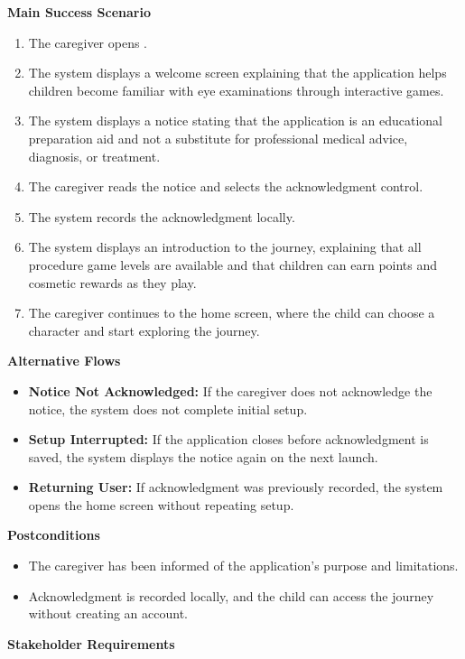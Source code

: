 \documentclass[10pt]{article}
\makeatletter
\newcommand{\termsecnum}{\ifnum\value{subsection}=0 \thesection\else\thesubsection\fi}
\newcommand{\termmark}[1]{%
  \hypertarget{term:#1}{}%
  \protected@write\@auxout{}{\string\newlabel{termsec:#1}{{\termsecnum}{\thepage}{}{}{}}}%
}
\makeatother
\begin{document}
\textbf{Main Success Scenario}
\begin{enumerate}
    \item The caregiver opens \progname{}.
    \item The system displays a welcome screen explaining that the
    application helps children become familiar with eye examinations
    through interactive games.
    \item The system displays a notice stating that the application is
    an educational preparation aid and not a substitute for professional
    medical advice, diagnosis, or treatment.
    \item The caregiver reads the notice and selects the acknowledgment
    control.
    \item The system records the acknowledgment locally.
    \item The system displays an introduction to the journey, explaining
    that all procedure game levels are available and that children can
    earn points and cosmetic rewards as they play.
    \item The caregiver continues to the \termmark{homescreen}home screen, where the child
    can choose a character and start exploring the journey.
\end{enumerate}

\textbf{Alternative Flows}
\begin{itemize}
    \item \textbf{Notice Not Acknowledged:} If the caregiver does not
    acknowledge the notice, the system does not complete initial setup.
    \item \textbf{Setup Interrupted:} If the application closes before
    acknowledgment is saved, the system displays the notice again on
    the next launch.
    \item \textbf{Returning User:} If acknowledgment was previously
    recorded, the system opens the home screen without repeating setup.
\end{itemize}

\textbf{Postconditions}
\begin{itemize}
    \item The caregiver has been informed of the application's purpose
    and limitations.
    \item Acknowledgment is recorded locally, and the child can access
    the journey without creating an account.
\end{itemize}

\textbf{Stakeholder Requirements}
\end{document}

